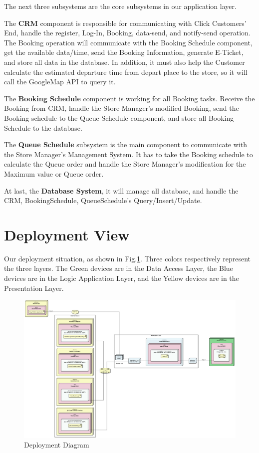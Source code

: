 \documentclass[a4paper,12pt]{report}
\begin{document}
The next three subsystems are the core subsystems in our application layer.

The \textbf{CRM} component is responsible for communicating with Click Customers' End, handle the register, Log-In, Booking, data-send, and notify-send operation.
The Booking operation will communicate with the Booking Schedule component, get the available data/time, send the Booking Information, generate E-Ticket, and store all data in the database.
In addition, it must also help the Customer calculate the estimated departure time from depart place to the store, so it will call the GoogleMap API to query it.

The \textbf{Booking Schedule} component is working for all Booking tasks.
Receive the Booking from CRM, handle the Store Manager's modified Booking, send the Booking schedule to the Queue Schedule component, and store all Booking Schedule to the database.

The \textbf{Queue Schedule} subsystem is the main component to communicate with the Store Manager's Management System.
It has to take the Booking schedule to calculate the Queue order and handle the Store Manager's modification for the Maximum value or Queue order.

At last, the \textbf{Database System}, it will manage all database, and handle the CRM, BookingSchedule, QueueSchedule's Query/Insert/Update.




\newpage
\section{Deployment View}\label{sec:deployment-view}

Our deployment situation, as shown in Fig.\ref{fig:deployment_diagram}.
Three colors respectively represent the three layers.
The Green devices are in the Data Access Layer, the Blue devices are in the Logic Application Layer,
and the Yellow devices are in the Presentation Layer.

\begin{figure}[H]
	\centering
	\includegraphics[width=1.2\textwidth]{deployment_diagram}
	\caption{Deployment Diagram}
	\centering
	\label{fig:deployment_diagram}
\end{figure}
\end{document}
